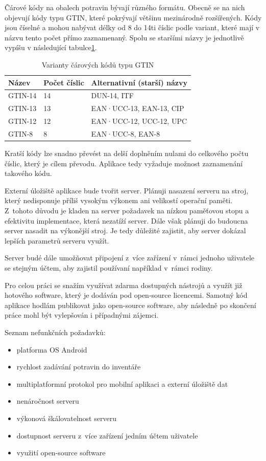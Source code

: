 \documentclass[thesis=B,czech]{FITthesis}[2013/10/20]
\begin{document}
Čárové kódy na obalech potravin bývají různého formátu. Obecně se na nich objevují kódy typu GTIN, které pokrývají většinu mezinárodně rozšířených. Kódy jsou číselné a mohou nabývat délky od 8 do 14ti číslic podle variant, které mají v názvu tento počet přímo zaznamenaný. Spolu se staršími názvy je jednotlivě vypíšu v následující tabulce\ref{table:carkod}.
\begin{table}[h]
      \begin{tabular}{|l|l|l|}
      \hline
      Název   & Počet číslic & Alternativní (starší) názvy \\ \hline
      GTIN-14 & 14           & DUN-14, ITF                 \\ \hline
      GTIN-13 & 13           & EAN·UCC-13, EAN-13, CIP     \\ \hline
      GTIN-12 & 12           & EAN·UCC-12, UCC-12, UPC     \\ \hline
      GTIN-8  & 8            & EAN·UCC-8, EAN-8            \\ \hline
      \end{tabular}
      \caption{Varianty čárových kódů typu GTIN}
      \label{table:carkod}
\end{table}
Kratší kódy lze snadno převést na delší doplněním nulami do celkového počtu číslic, který je cílem převodu. Aplikace tedy vyžaduje možnost zaznamenání takového kódu.

Externí úložiště aplikace bude tvořit server. Plánuji nasazení serveru na stroj, který nedisponuje příliš vysokým výkonem ani velikostí operační paměti. Z~tohoto důvodu je kladen na server požadavek na nízkou paměťovou stopu a efektivitu implementace, která nezatíží server. Dále však plánuji do budoucna server nasadit na výkonější stroj. Je tedy důležité zajistit, aby server dokázal lepších parametrů serveru využít.

Server budé dále umožňovat připojení z~více zařízení v~rámci jednoho uživatele se stejným účtem, aby zajistil používaní například v~rámci rodiny. 

Pro celou práci se snažím využívat zdarma dostupných nástrojů a využít již hotového software, který je dodáván pod open-source licencemi. Samotný kód aplikace hodlám publikovat jako open-source software, aby následně po skončení práce mohl být vylepšován i případnými zájemci.

Seznam nefunkčních požadavků:

\begin{itemize}
  \item platforma OS Android
  \item rychlost zadávání potravin do inventáře
  \item multiplatformní protokol pro mobilní aplikaci a externí úložiště dat
  \item nenáročnost serveru
  \item výkonová škálovatelnost serveru
  \item dostupnost serveru z~více zařízení jedním účtem uživatele
  \item využití open-source software
\end{itemize}
\end{document}
